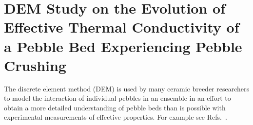 \chapter{DEM Study on the Evolution of Effective Thermal Conductivity of a Pebble Bed Experiencing Pebble Crushing}\label{sec:dem-studies}
The discrete element method (DEM) is used by many ceramic breeder researchers to model the interaction of individual pebbles in an ensemble in an effort to obtain a more detailed understanding of pebble beds than is possible with experimental measurements of effective properties. For example see Refs.~\cite{An20071393, Lu2000, Zhao2010, Gan2010a, Annabattula2012a, VanLew2014}.


